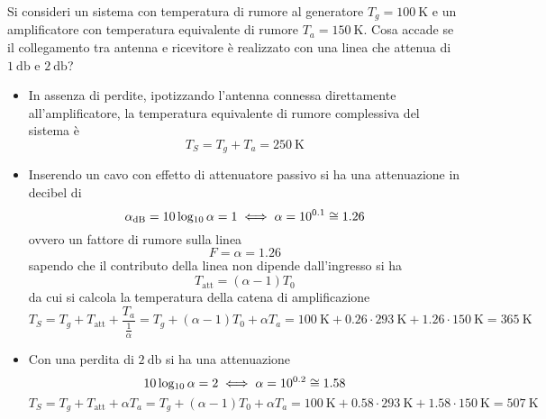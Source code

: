 \begin{esempio}
	Si consideri un sistema con temperatura di rumore al generatore $T_g=\SI{100}{\kelvin}$ e un amplificatore con temperatura equivalente di rumore $T_a=\SI{150}{\kelvin}$. Cosa accade se il collegamento tra antenna e ricevitore è realizzato con una linea che attenua di $\SI{1}{\decibel}$ e $\SI{2}{\decibel}$?
	
	\begin{itemize}
		\item In assenza di perdite, ipotizzando l'antenna connessa direttamente all'amplificatore, la temperatura equivalente di rumore complessiva del sistema è
		\[T_S=T_g+T_a=\SI{250}{\kelvin}\]
		\item Inserendo un cavo con effetto di attenuatore passivo si ha una attenuazione in decibel di
		\[\alpha_\text{dB}=10\operatorname{log_{10}}\alpha=1 \iff \alpha=10^{0.1}\cong\num{1.26}\]
		ovvero un fattore di rumore sulla linea
		\[ F= \alpha= \num{1.26}\]
		sapendo che il contributo della linea non dipende dall'ingresso si ha
		\[ T_\text{att}=(\alpha-1) T_0 \]
		da cui si calcola la temperatura della catena di amplificazione
		\[ T_S=T_g+T_\text{att}+\frac{ T_a }{\frac{1}{\alpha}}= T_g+(\alpha-1)T_0+\alpha T_a=\SI{100}{\kelvin}+0.26\cdot\SI{293}{\kelvin}+1.26\cdot\SI{150}{\kelvin}=\SI{365}{\kelvin}\]
		
		\item Con una perdita di $\SI{2}{\decibel}$ si ha una attenuazione
		\[10\operatorname{log_{10}}\alpha=2 \iff \alpha=10^{0.2}\cong\num{1.58}\]
		\[ T_S=T_g+T_\text{att}+\alpha T_a= T_g+(\alpha-1)T_0+\alpha T_a=\SI{100}{\kelvin}+0.58\cdot\SI{293}{\kelvin}+1.58\cdot\SI{150}{\kelvin}=\SI{507}{\kelvin}\]
	\end{itemize}
\end{esempio}

